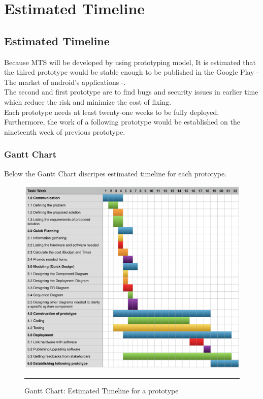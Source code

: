 \chapter{Estimated Timeline} 

\label{Chapter3} 


\doublespacing

\section{Estimated Timeline}
Because MTS will be developed by using prototyping model, It is estimated that the thired prototype would be stable enough to be published in the Google Play - The market of android's applications -.\linebreak \\

The second and first prototype are to find bugs and security issues in earlier time which reduce the risk and minimize the cost of fixing.\linebreak \\

Each prototype needs at least twenty-one weeks to be fully deployed. Furthermore, the work of a following prototype would be established on the nineteenth week of previous prototype. \\

\pagebreak

\subsection{Gantt Chart}

Below the Gantt Chart discripes estimated timeline for each prototype.\\

\begin{figure}[H]
	\centering
	\includegraphics[scale=0.55]{Figures/FigureGanttChart.png}
	\rule{35em}{0.5pt}
	\caption[Gantt Chart: Estimated Timeline for a prototype]{Gantt Chart: Estimated Timeline for a prototype}
\end{figure}





